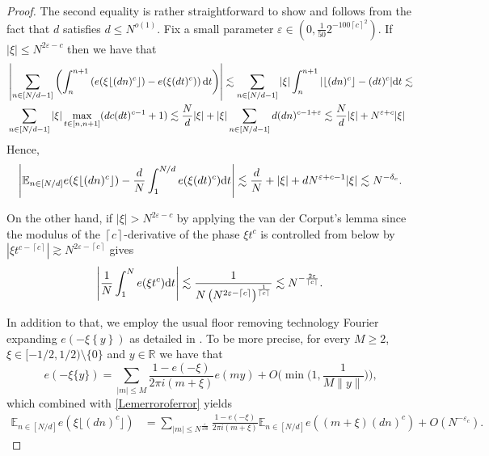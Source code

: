 \documentclass[10pt,leqno]{amsart}
\def\eps{\varepsilon}
\def\d{{\rm d}}
\numberwithin{equation}{section}
\numberwithin{counter2}{section}
\theoremstyle{definition}
\theoremstyle{plain}
\newcommand{\floor}[1]{\lfloor #1 \rfloor}
\newcommand{\ceiling}[1]{\left\lceil #1 \right\rceil}
\newcommand{\EE}{\mathbb{E}}
\begin{document}
	\begin{proof}
		The second equality is rather straightforward to show and follows from the fact that $d$ satisfies $d\leq N^{o(1)}$. Fix a small parameter $\eps \in (0, \frac{1}{50}2^{-100\ceiling{c}^2})$.	If $|\xi| \leq N^{2\eps-c}$ then we have that \[\begin{split}
			&	\left| \sum_{n \in [N/d-1]}\left(\int_{n}^{n+1} \left(e(\xi \floor{(dn)^c})- e(\xi (dt)^c)\right) \d t \right) \right| \lesssim \sum_{n \in [N/d-1]} |\xi| \int_{n}^{n+1} | \floor{(dn)^c}-(dt)^c| \d t  \lesssim \\ &  \sum_{n \in [N/d-1]} |\xi| \max_{ t\in [n,n+1]}(dc(dt)^{c-1}+1 )\lesssim  \frac{N}{d}|\xi| +|\xi| \sum_{n \in [N/d-1]} d (dn)^{c-1+\eps} \lesssim \frac{N}{d}|\xi| + N^{\eps+c}|\xi|
		\end{split}\] 
        Hence, \[  \left|\EE_{n \in [N/d]}e(\xi \floor{(dn)^c} )-\frac{d}{N} \int_{1}^{N/d} e(\xi (dt)^c) \d t \right| \lesssim \frac{d}{N}+	|\xi|+dN^{\eps+c-1}|\xi|  \lesssim N^{-\delta_c}. \]
		
        
        On the other hand, if $|\xi| >N^{2\eps-c}$ by applying the van der Corput's lemma  since the modulus of the $\ceiling{c}$-derivative of the phase $\xi t^c$ is controlled from below by $|\xi t^{c-\ceiling{c}} | \gtrsim  N^{2\eps-\ceiling{c}}  $ gives \[ \left|\frac{1}{N} \int_{1}^N e(\xi t^c) \d t \right| \lesssim  \frac{1}{N \left( N^{2\eps-\ceiling{c}}  \right)^{\frac{1}{\ceiling{c}}}} \lesssim N^{-\frac{2\eps}{\ceiling{c}}}.   \]
		
        
        In addition to that, we employ the usual floor removing technology Fourier expanding $e(-\xi \left\{y\right\})$ as detailed in \cite[Page 29]{LPE}. To be more precise, for every $M\ge 2$, $\xi \in[-1/2,1/2)\setminus\{0\}$ and $y\in\mathbb{R}$ we have that
		\[
		e(-\xi \{y\})=\sum_{|m|\le M}\frac{1-e(-\xi )}{2\pi i (m+\xi )}e(my)+O\bigg(\min\bigg(1,\frac{1}{M\|y\|}\bigg)\bigg)\text{,}
		\]
		which combined with \eqref{Lemerroroferror} yields
		\[\begin{split}
			\EE_{n \in [N/d]}e(\xi \floor{(dn)^c})&=\sum_{|m| \leq N^{\frac{\eps}{100}}} \frac{1-e(-\xi)}{2 \pi i(m+\xi)} \EE_{n \in [N/d]} e\left((m+\xi)(dn)^c\right)+O(N^{-\eps_c}).
			\end{split} \] 
		

\end{proof}
\end{document}
